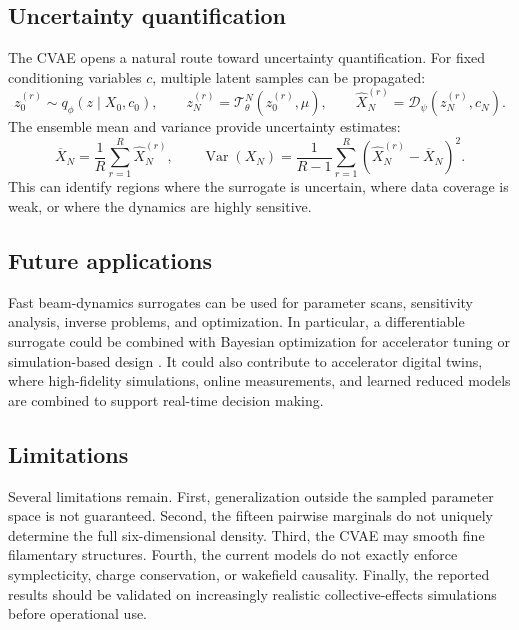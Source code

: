 \documentclass[11pt,a4paper]{article}
\begin{document}
\begin{sloppypar}
\subsection{Uncertainty quantification}
The CVAE opens a natural route toward uncertainty quantification. For fixed conditioning variables $c$, multiple latent samples can be propagated:
\begin{equation}
    z_0^{(r)}\sim q_{\phi}(z\mid X_0,c_0),
    \qquad
    z_N^{(r)}=\mathcal{T}_{\theta}^{N}(z_0^{(r)},\mu),
    \qquad
    \widehat{X}_N^{(r)}=\mathcal{D}_{\psi}(z_N^{(r)},c_N).
\end{equation}
The ensemble mean and variance provide uncertainty estimates:
\begin{equation}
    \overline{X}_N=\frac{1}{R}\sum_{r=1}^{R}\widehat{X}_N^{(r)},
    \qquad
    \operatorname{Var}(X_N)=\frac{1}{R-1}\sum_{r=1}^{R}
    \left(\widehat{X}_N^{(r)}-\overline{X}_N\right)^2.
\end{equation}
This can identify regions where the surrogate is uncertain, where data coverage is weak, or where the dynamics are highly sensitive.

\subsection{Future applications}
Fast beam-dynamics surrogates can be used for parameter scans, sensitivity analysis, inverse problems, and optimization. In particular, a differentiable surrogate could be combined with Bayesian optimization for accelerator tuning or simulation-based design \cite{roussel_bayesian_2024}. It could also contribute to accelerator digital twins, where high-fidelity simulations, online measurements, and learned reduced models are combined to support real-time decision making.

\subsection{Limitations}
Several limitations remain. First, generalization outside the sampled parameter space is not guaranteed. Second, the fifteen pairwise marginals do not uniquely determine the full six-dimensional density. Third, the CVAE may smooth fine filamentary structures. Fourth, the current models do not exactly enforce symplecticity, charge conservation, or wakefield causality. Finally, the reported results should be validated on increasingly realistic collective-effects simulations before operational use.


\end{sloppypar}
\end{document}
